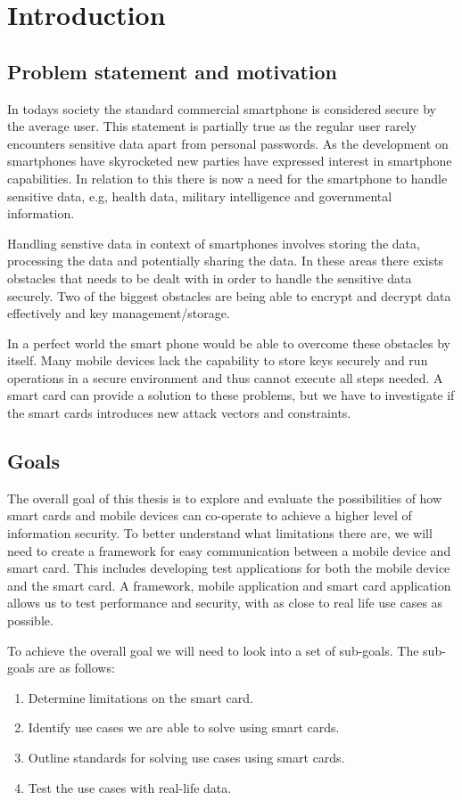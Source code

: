 \chapter{Introduction}
\section{Problem statement and motivation}
In todays society the standard commercial smartphone is considered secure by the average user. This statement is partially true as the regular user rarely encounters sensitive data apart from personal passwords. As the development on smartphones have skyrocketed new parties have expressed interest in smartphone capabilities. In relation to this there is now a need for the smartphone to handle sensitive data, e.g, health data, military intelligence and governmental information.

Handling senstive data in context of smartphones involves storing the data, processing the data and potentially sharing the data. In these areas there exists obstacles that needs to be dealt with in order to handle the sensitive data securely. Two of the biggest obstacles are being able to encrypt and decrypt data effectively and key management/storage.

In a perfect world the smart phone would be able to overcome these obstacles by itself. Many mobile devices lack the capability to store keys securely and run operations in a secure environment and thus cannot execute all steps needed. A smart card can provide a solution to these problems, but we have to investigate if the smart cards introduces new attack vectors and constraints.

\section{Goals}
The overall goal of this thesis is to explore and evaluate the possibilities of how smart cards and mobile devices can co-operate to achieve a higher level of information security. To better understand what limitations there are, we will need to create a framework for easy communication between a mobile device and smart card. This includes developing test applications for both the mobile device and the smart card. A framework, mobile application and smart card application allows us to test performance and security, with as close to real life use cases as possible.

To achieve the overall goal we will need to look into a set of sub-goals. The sub-goals are as follows:
\begin{enumerate}
    \item Determine limitations on the smart card.
    \item Identify use cases we are able to solve using smart cards.
    \item Outline standards for solving use cases using smart cards.
    \item Test the use cases with real-life data.
\end{enumerate}

